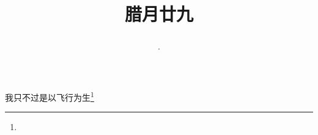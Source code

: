 \title{\date[d=8,m=2,y=2024][year:cn-y,年,month:cn,day:cn,日,·,weekday]·腊月廿九 }
我只不过是以飞行为生\footnote{ }

